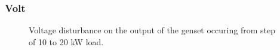 % 

% 

% 

% 

% 

% 

% 

\subsubsection*{Volt}
\begin{figure}[H]
\centering

\caption{Voltage disturbance on the output of the genset occuring from step of 10 to 20 kW load.}
\label{fig:test8-9-10to20kwstepvolt}
\end{figure}

